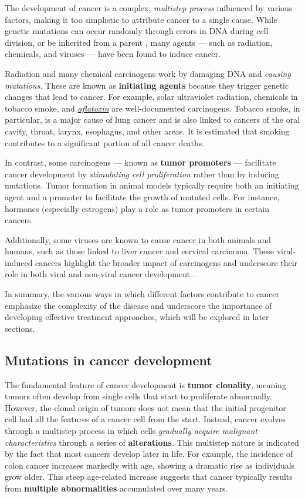 The development of cancer is a complex, \textit{multistep process} influenced by various factors, making it too simplistic to attribute cancer to a single cause. While genetic mutations can occur randomly through errors in DNA during cell division, or be inherited from a parent \cite{cancer2}, many agents --- such as radiation, chemicals, and viruses --- have been found to induce cancer.

Radiation and many chemical carcinogens work by damaging DNA and \textit{causing mutations}. These are known as \textbf{initiating agents} because they trigger genetic changes that lead to cancer. For example, solar ultraviolet radiation, chemicals in tobacco smoke, and \href{https://en.wikipedia.org/wiki/Aflatoxin}{\textit{aflatoxin}} are well-documented carcinogens. Tobacco smoke, in particular, is a major cause of lung cancer and is also linked to cancers of the oral cavity, throat, larynx, esophagus, and other areas. It is estimated that smoking contributes to a significant portion of all cancer deaths.

In contrast, some carcinogens --- known as \textbf{tumor promoters} --- facilitate cancer development by \textit{stimulating cell proliferation} rather than by inducing mutations. Tumor formation in animal models typically require both an initiating agent and a promoter to facilitate the growth of mutated cells. For instance, hormones (especially estrogens) play a role as tumor promoters in certain cancers.

Additionally, some viruses are known to cause cancer in both animals and humans, such as those linked to liver cancer and cervical carcinoma. These viral-induced cancers highlight the broader impact of carcinogens and underscore their role in both viral and non-viral cancer development \cite{nih_cancer_dev}.

In summary, the various ways in which different factors contribute to cancer emphasize the complexity of the disease and underscore the importance of developing effective treatment approaches, which will be explored in later sections.

\subsection{Mutations in cancer development}

The fundamental feature of cancer development is \textbf{tumor clonality}, meaning tumors often develop from single cells that start to proliferate abnormally. However, the clonal origin of tumors does not mean that the initial progenitor cell had all the features of a cancer cell from the start. Instead, cancer evolves through a multistep process in which cells \textit{gradually acquire malignant characteristics} through a series of \textbf{alterations}. This multistep nature is indicated by the fact that most cancers develop later in life. For example, the incidence of colon cancer increases markedly with age, showing a dramatic rise as individuals grow older. This steep age-related increase suggests that cancer typically results from \textbf{multiple abnormalities} accumulated over many years.


